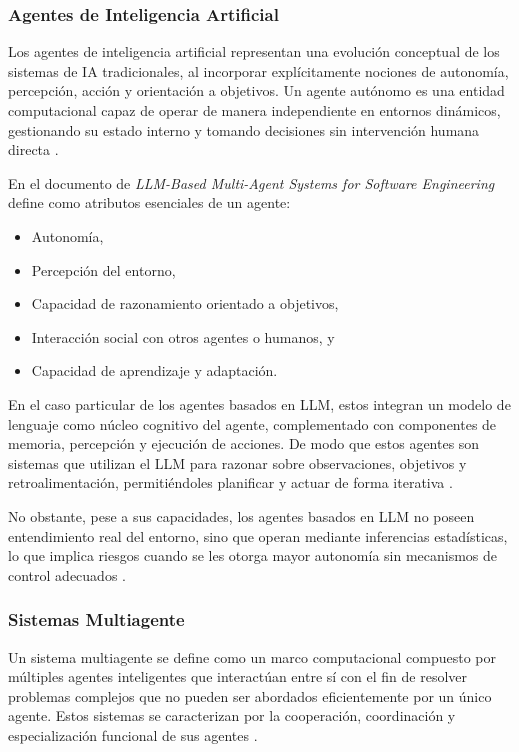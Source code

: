 \subsubsection{Agentes de Inteligencia Artificial}

Los agentes de inteligencia artificial representan una evolución  conceptual  de
los sistemas de IA  tradicionales,  al  incorporar  explícitamente  nociones  de
autonomía, percepción, acción y orientación a objetivos. Un agente  autónomo  es
una entidad computacional capaz de operar de manera  independiente  en  entornos
dinámicos, gestionando su estado interno y tomando decisiones  sin  intervención
humana directa \parencite[]{he2025llm}.

En el documento de \textit{LLM-Based Multi-Agent Systems for Software
      Engineering} define como atributos esenciales de un agente:

\begin{itemize}
      \item Autonomía,
      \item Percepción del entorno,
      \item Capacidad de razonamiento orientado a objetivos,
      \item Interacción social con otros agentes o humanos, y
      \item Capacidad de aprendizaje y adaptación.
\end{itemize}

En el caso particular de los agentes basados en LLM, estos integran un modelo de
lenguaje como núcleo cognitivo del  agente,  complementado  con  componentes  de
memoria, percepción y ejecución de acciones.  De  modo  que  estos  agentes  son
sistemas que utilizan el LLM  para  razonar  sobre  observaciones,  objetivos  y
retroalimentación,  permitiéndoles  planificar  y  actuar  de  forma   iterativa
\parencite[]{he2025llm}.

No obstante, pese a sus capacidades,  los  agentes  basados  en  LLM  no  poseen
entendimiento  real  del  entorno,  sino   que   operan   mediante   inferencias
estadísticas, lo que implica riesgos cuando se les otorga  mayor  autonomía  sin
mecanismos de control adecuados \parencite[]{he2025llm}.

\subsubsection{Sistemas Multiagente}

Un sistema multiagente se define  como  un  marco  computacional  compuesto  por
múltiples agentes inteligentes que interactúan entre sí con el fin  de  resolver
problemas complejos que no pueden ser  abordados  eficientemente  por  un  único
agente. Estos sistemas  se  caracterizan  por  la  cooperación,  coordinación  y
especialización funcional de sus agentes \parencite[]{he2025llm}.

